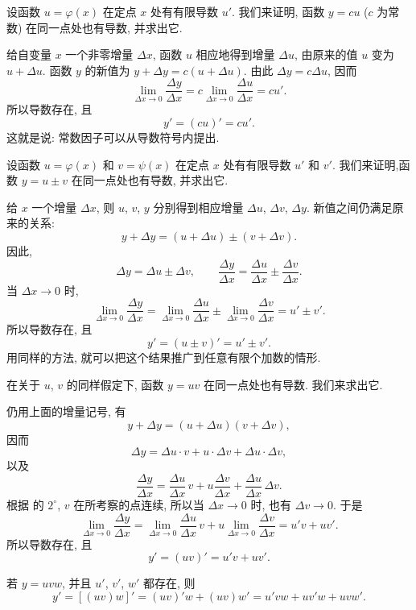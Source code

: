 \label{rule:derivative_constant_multiple}
{\kaishu 设函数 $u=\varphi(x)$ 在定点 $x$ 处有有限导数 $u'$.}
我们来证明, {\kaishu 函数 $y=cu$ ($c$ 为常数) 在同一点处也有导数, 并求出它.}

给自变量 $x$ 一个非零增量 $\Delta x$, 函数 $u$ 相应地得到增量 $\Delta u$,
由原来的值 $u$ 变为 $u+\Delta u$.
函数 $y$ 的新值为
$
y+\Delta y=c(u+\Delta u).
$
由此 $\Delta y=c\Delta u$, 因而
$$
\lim_{\Delta x\to0}\frac{\Delta y}{\Delta x}
=c\lim_{\Delta x\to0}\frac{\Delta u}{\Delta x}=cu'.
$$
所以导数存在, 且
$$
y'=(cu)'=cu'.
$$
这就是说: {\kaishu 常数因子可以从导数符号内提出.}

\label{rule:derivative_sum_difference}
{\kaishu 设函数 $u=\varphi(x)$ 和 $v=\psi(x)$ 在定点 $x$ 处有有限导数 $u'$ 和 $v'$.}
我们来证明,{\kaishu 函数 $y=u\pm v$ 在同一点处也有导数, 并求出它.}

给 $x$ 一个增量 $\Delta x$, 则 $u$, $v$, $y$ 分别得到相应增量
$\Delta u$, $\Delta v$, $\Delta y$.
新值之间仍满足原来的关系:
$$
y+\Delta y=(u+\Delta u)\pm(v+\Delta v).
$$
因此,
$$
\Delta y=\Delta u\pm\Delta v,\qquad
\frac{\Delta y}{\Delta x}
=\frac{\Delta u}{\Delta x}\pm\frac{\Delta v}{\Delta x}.
$$
当 $\Delta x\to0$ 时,
$$
\lim_{\Delta x\to0}\frac{\Delta y}{\Delta x}
=\lim_{\Delta x\to0}\frac{\Delta u}{\Delta x}
\pm\lim_{\Delta x\to0}\frac{\Delta v}{\Delta x}
=u'\pm v'.
$$
所以导数存在, 且
$$
y'=(u\pm v)'=u'\pm v'.
$$
用同样的方法, 就可以把这个结果推广到任意有限个加数的情形.

\label{rule:derivative_product}
{\kaishu 在关于 $u$, $v$ 的同样假定下, 函数 $y=uv$ 在同一点处也有导数.
我们来求出它.}

仍用上面的增量记号, 有
$$
y+\Delta y=(u+\Delta u)(v+\Delta v),
$$
因而
$$
\Delta y=\Delta u\cdot v+u\cdot\Delta v+\Delta u\cdot\Delta v,
$$
以及
$$
\frac{\Delta y}{\Delta x}
=\frac{\Delta u}{\Delta x}\,v
+u\frac{\Delta v}{\Delta x}
+\frac{\Delta u}{\Delta x}\,\Delta v.
$$
根据  的
\hyperref[prop:differentiability_implies_continuity]{$2^\circ$},
$v$ 在所考察的点连续, 所以当 $\Delta x\to0$ 时, 也有 $\Delta v\to0$.
于是
$$
\lim_{\Delta x\to0}\frac{\Delta y}{\Delta x}
=\lim_{\Delta x\to0}\frac{\Delta u}{\Delta x}\,v
+u\lim_{\Delta x\to0}\frac{\Delta v}{\Delta x}
=u'v+uv'.
$$
所以导数存在, 且
$$
y'=(uv)'=u'v+uv'.
$$

若 $y=uvw$, 并且 $u'$, $v'$, $w'$ 都存在, 则
$$
y'=[(uv)w]'=(uv)'w+(uv)w'=u'vw+uv'w+uvw'.
$$

